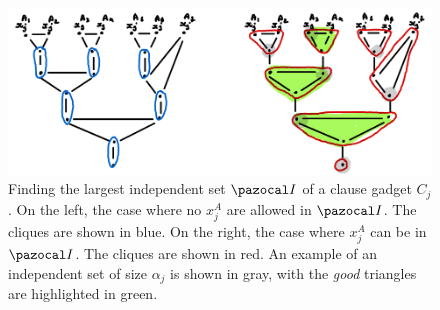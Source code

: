 \begin{figure}
    \includegraphics[width=\textwidth]{figures/indset-td-best.png}
    \caption{Finding the largest independent set $\I$ of a clause gadget $C_j$. On the left, the case where no $x_j^A$ are allowed in $\I$. The cliques are shown in blue. On the right, the case where $x_j^A$ can be in $\I$. The cliques are shown in red. An example of an independent set of size $\alpha_j$ is shown in gray, with the \textit{good} triangles are highlighted in green.}
    \label{fig:indset-td-best}
\end{figure}